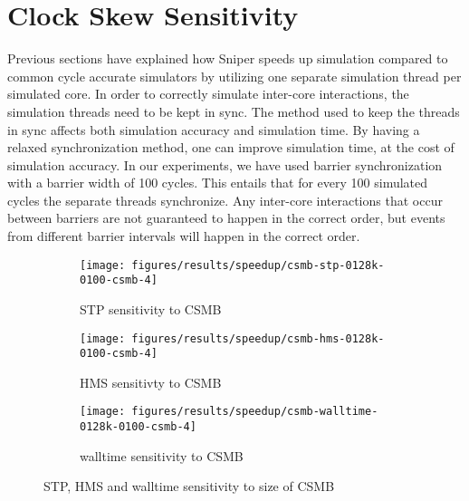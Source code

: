 
\section{Clock Skew Sensitivity}
\label{sec:results:csmb_sensitivity}

Previous sections have explained how Sniper speeds up simulation compared to common cycle accurate simulators by utilizing one separate simulation thread per simulated core.
In order to correctly simulate inter-core interactions, the simulation threads need to be kept in sync.
The method used to keep the threads in sync affects both simulation accuracy and simulation time.
By having a relaxed synchronization method, one can improve simulation time, at the cost of simulation accuracy.
In our experiments, we have used barrier synchronization with a barrier width of 100 cycles.
This entails that for every 100 simulated cycles the separate threads synchronize.
Any inter-core interactions that occur between barriers are not guaranteed to happen in the correct order, but events from different barrier intervals will happen in the correct order.


\begin{figure}
    \centering
    \begin{subfigure}[b]{0.5\textwidth}
        \texttt{[image: figures/results/speedup/csmb-stp-0128k-0100-csmb-4]}
        \caption{STP sensitivity to CSMB}
        \label{fig:results:base:csmb:stp}
    \end{subfigure}%
    \begin{subfigure}[b]{0.5\textwidth}
        \texttt{[image: figures/results/speedup/csmb-hms-0128k-0100-csmb-4]}
        \caption{HMS sensitivty to CSMB}
        \label{fig:results:base:csmb:hms}
    \end{subfigure}
    \begin{subfigure}[b]{0.6\textwidth}
        \texttt{[image: figures/results/speedup/csmb-walltime-0128k-0100-csmb-4]}
        \caption{walltime sensitivity to CSMB}
        \label{fig:results:base:csmb:mpki}
    \end{subfigure}
    \caption{STP, HMS and walltime sensitivity to size of CSMB}
    \label{fig:results:csmb}
\end{figure}




